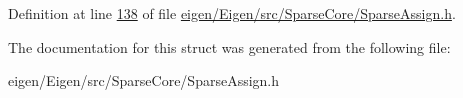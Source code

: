 Definition at line \hyperlink{eigen_2_eigen_2src_2_sparse_core_2_sparse_assign_8h_source_l00138}{138} of file \hyperlink{eigen_2_eigen_2src_2_sparse_core_2_sparse_assign_8h_source}{eigen/\+Eigen/src/\+Sparse\+Core/\+Sparse\+Assign.\+h}.



The documentation for this struct was generated from the following file\+:\begin{DoxyCompactItemize}
\item 
eigen/\+Eigen/src/\+Sparse\+Core/\+Sparse\+Assign.\+h\end{DoxyCompactItemize}
